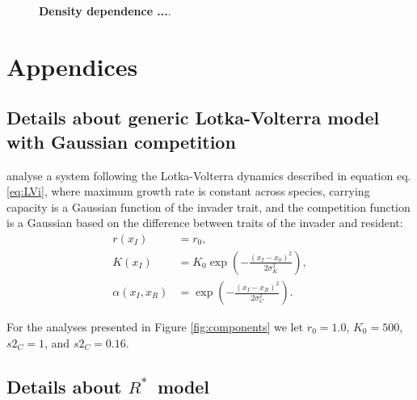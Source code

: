 \documentclass[a4paper,11pt]{article}
\newcommand{\Rstar}{\ensuremath{R^*}}
\begin{document}
\begin{figure}[h]
  \centering
  \caption{\textbf{Density dependence
  ...}.
  \label{fig:dd}}
\end{figure}


\clearpage




\section{Appendices}

\subsection{Details about generic Lotka-Volterra model with
Gaussian competition}\label{sec:DD99}

\citet{Dieckmann-1999} analyse a system following the Lotka-Volterra dynamics
described in equation eq. \ref{eq:LVi}, where maximum growth rate is constant
across species, carrying capacity is a Gaussian
function of the invader trait, and the competition function is a Gaussian
based on the difference between traits of the invader and resident:
\begin{subequations}
\begin{align}
\label{eq:DD}
r(x_I) &= r_0, \\
K(x_I) &= K_0 \exp\left(-\frac{\left(x_I-x_0\right)^2}{2\sigma^2_K}\right),\\
\alpha(x_I, x_R) &= \exp\left(-\frac{\left(x_I-x_R\right)^2}{2\sigma^2_C}\right).
\end{align}
\end{subequations}

For the analyses presented in Figure \ref{fig:components} we let $r_0=1.0$, $K_0=500$,
 $s2_C=1$, and $s2_C=0.16$.

\subsection{Details about \Rstar\ model}\label{sec:Rstar}
\end{document}

